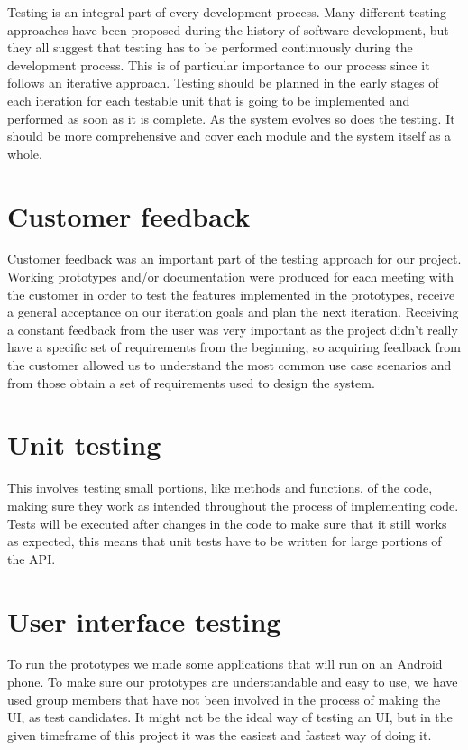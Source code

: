 
Testing is an integral part of every development process.
Many different testing approaches have been proposed during the history of
software development, but they all suggest that testing has to be performed continuously
during the development process. This is of particular importance to our process since
it follows an iterative approach. Testing should be planned in the early stages of each
iteration for each testable unit that is going to be implemented and performed as soon as
it is complete. As the system evolves so does the testing. It should be more comprehensive
and cover each module and the system itself as a whole.

\section{Customer feedback}
Customer feedback was an important part of the testing approach for our project.
Working prototypes and/or documentation were produced for each meeting with the customer
in order to test the features implemented in the prototypes, receive a general acceptance
on our iteration goals and plan the next iteration. Receiving a constant feedback from the
user was very important as the project didn't really have a specific set of requirements from
the beginning, so acquiring feedback from the customer allowed us to understand the most common
use case scenarios and from those obtain a set of requirements used to design the system.

\section{Unit testing}
This involves testing small portions, like methods and functions, of the code, making sure they work 
as intended throughout the process of implementing code. Tests will be executed after changes in the 
code to make sure that it still works as expected, this means that unit tests have to be written for 
large portions of the API.

\section{User interface testing}
To run the prototypes we made some applications that will run on an Android phone. To make sure our 
prototypes are understandable and easy to use, we have used group members that have not been 
involved in the process of making the UI, as test candidates. It might not be the ideal way of testing 
an UI, but in the given timeframe of this project it was the easiest and fastest way of doing it.

